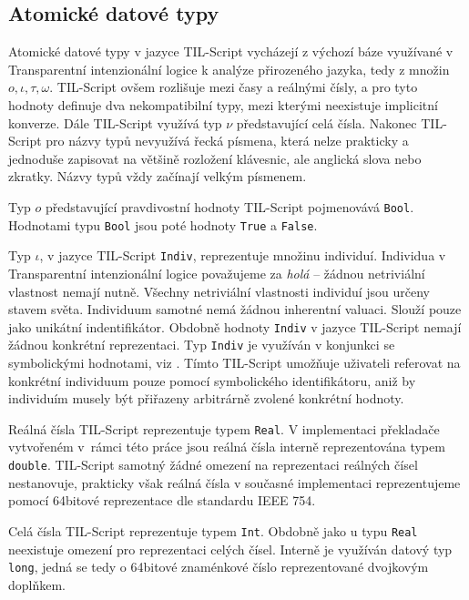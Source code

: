 \subsection{Atomické datové typy}

Atomické datové typy v jazyce TIL-Script vycházejí z výchozí báze využívané v Transparentní
intenzionální logice k analýze přirozeného jazyka, tedy z množin ${o, \iota, \tau, \omega}$. TIL-Script ovšem
rozlišuje mezi časy a reálnými čísly, a pro tyto hodnoty definuje dva nekompatibilní typy, mezi
kterými neexistuje implicitní konverze. Dále TIL-Script využívá typ $\nu$ představující celá
čísla. Nakonec TIL-Script pro názvy typů nevyužívá řecká písmena, která nelze prakticky a jednoduše
zapisovat na většině rozložení klávesnic, ale anglická slova nebo zkratky. Názvy typů vždy začínají
velkým písmenem.

Typ $o$ představující pravdivostní hodnoty TIL-Script pojmenovává \lstinline{Bool}. Hodnotami typu
\lstinline{Bool} jsou poté hodnoty \lstinline{True} a \lstinline{False}.

Typ $\iota$, v jazyce TIL-Script \lstinline{Indiv}, reprezentuje množinu individuí. Individua
v Transparentní intenzionální logice považujeme za \textit{holá} -- žádnou netriviální vlastnost
nemají nutně\cite{til-duzi}. Všechny netriviální vlastnosti individuí jsou určeny stavem světa.
Individuum samotné nemá žádnou inherentní valuaci. Slouží pouze jako unikátní indentifikátor.
Obdobně hodnoty \lstinline{Indiv} v jazyce TIL-Script nemají žádnou konkrétní reprezentaci. Typ
\lstinline{Indiv} je využíván v konjunkci se symbolickými hodnotami, viz .
Tímto TIL-Script umožňuje uživateli referovat na konkrétní individuum pouze pomocí symbolického
identifikátoru, aniž by individuím musely být přiřazeny arbitrárně zvolené konkrétní hodnoty.

Reálná čísla TIL-Script reprezentuje typem \lstinline{Real}. V implementaci překladače vytvořeném
v~rámci této práce jsou reálná čísla interně reprezentována typem \lstinline{double}. TIL-Script
samotný žádné omezení na reprezentaci reálných čísel nestanovuje, prakticky však reálná čísla
v současné implementaci reprezentujeme pomocí 64bitové reprezentace dle standardu IEEE 754.

Celá čísla TIL-Script reprezentuje typem \lstinline{Int}. Obdobně jako u typu \lstinline{Real}
neexistuje omezení pro reprezentaci celých čísel. Interně je využíván datový typ \lstinline{long},
jedná se tedy o 64bitové znaménkové číslo reprezentované dvojkovým doplňkem.

